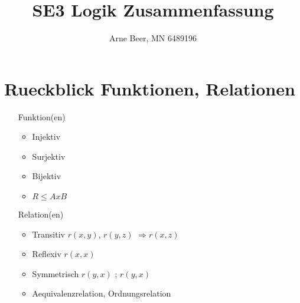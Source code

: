 \documentclass{article}
\title{SE3 Logik Zusammenfassung}
\author{Arne Beer, MN 6489196}
\begin{document}
\maketitle
\section*{Rueckblick Funktionen, Relationen}
    \begin{itemize}
        \item[Funktion(en)] 
            \begin{itemize}
                \item Injektiv
                \item Surjektiv
                \item Bijektiv
                \item $R \leq A x B$ 
            \end{itemize}

        \item[Relation(en)]
            \begin{itemize}
                \item Transitiv $r(x,y)$, $r(y, z)$ $\Longrightarrow r(x,z)$
                \item Reflexiv $r(x,x)$
                \item Symmetrisch $r(y,x)$ ; $r(y,x)$
                \item Aequivalenzrelation, Ordnungsrelation
            \end{itemize}
    \end{itemize}
\end{document}
